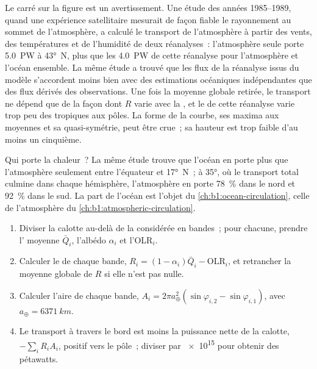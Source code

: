 Le carré sur la figure est un avertissement. Une étude des années 1985--1989, quand une
expérience satellitaire mesurait de façon fiable le rayonnement au sommet de l'atmosphère,
a calculé le transport de l'atmosphère à partir des vents, des températures et de l'humidité
de deux réanalyses~: l'atmosphère seule porte \qty{5.0}{PW} à \ang{43}~N, plus
que les \qty{4.0}{PW} de cette réanalyse pour l'atmosphère et l'océan ensemble. La
même étude a trouvé que les flux de la réanalyse issus du modèle s'accordent moins bien
avec des estimations océaniques indépendantes que des flux dérivés des observations. Une fois
la moyenne globale retirée, le transport ne dépend que de la façon dont $R$ varie avec la
, et le  de cette réanalyse varie trop peu des tropiques aux
pôles. La forme de la courbe, ses maxima aux moyennes  et sa
quasi-symétrie, peut être crue~; sa hauteur est trop faible d'au moins un cinquième.

Qui porte la chaleur~? La même étude trouve que l'océan en porte
plus que l'atmosphère seulement entre l'équateur et \ang{17}~N~; à \ang{35},
où le transport total culmine dans chaque hémisphère, l'atmosphère en porte
\qty{78}{\percent} dans le nord et \qty{92}{\percent} dans le sud. La part de
l'océan est l'objet du \cref{ch:b1:ocean-circulation}, celle de l'atmosphère
du \cref{ch:b1:atmospheric-circulation}.

\begin{method}\label{met:b1:radiation-heat-transport:bands}
\begin{enumerate}
  \item Diviser la calotte au-delà de la  considérée en bandes~; pour chacune,
        prendre l' moyenne $\bar Q_i$, l'albédo $\alpha_i$ et l'OLR$_i$.
  \item Calculer le  de chaque bande, $R_i = (1 - \alpha_i)\bar Q_i -
        \text{OLR}_i$, et retrancher la moyenne globale de $R$ si elle n'est pas nulle.
  \item Calculer l'aire de chaque bande, $A_i = 2\pi a_\oplus^2(\sin\varphi_{i,2} -
        \sin\varphi_{i,1})$, avec $a_\oplus = \qty{6371}{km}$.
  \item Le transport à travers le bord est moins la puissance nette de la calotte,
        $-\sum_i R_i A_i$, positif vers le pôle~; diviser par \num{e15} pour obtenir
        des pétawatts.
\end{enumerate}
\end{method}

